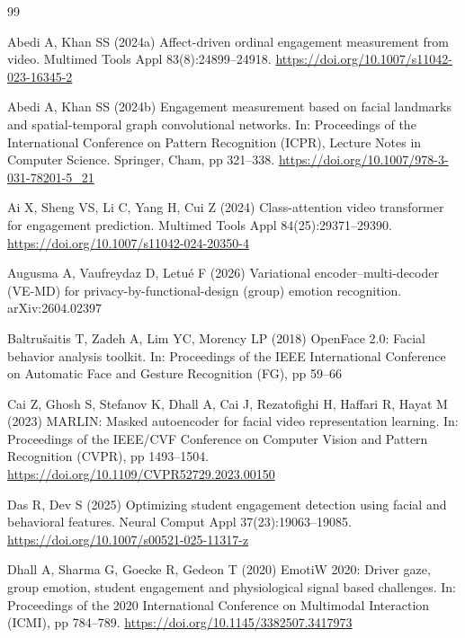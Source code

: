 \documentclass[pdflatex,iicol,sn-basic]{sn-jnl}
\begin{document}
\begin{thebibliography}{99}

Abedi A, Khan SS (2024a) Affect-driven ordinal engagement measurement from video. Multimed Tools Appl 83(8):24899--24918. \url{https://doi.org/10.1007/s11042-023-16345-2}

Abedi A, Khan SS (2024b) Engagement measurement based on facial landmarks and spatial-temporal graph convolutional networks. In: Proceedings of the International Conference on Pattern Recognition (ICPR), Lecture Notes in Computer Science. Springer, Cham, pp 321--338. \url{https://doi.org/10.1007/978-3-031-78201-5\_21}

Ai X, Sheng VS, Li C, Yang H, Cui Z (2024) Class-attention video transformer for engagement prediction. Multimed Tools Appl 84(25):29371--29390. \url{https://doi.org/10.1007/s11042-024-20350-4}

Augusma A, Vaufreydaz D, Letu\'{e} F (2026) Variational encoder--multi-decoder (VE-MD) for privacy-by-functional-design (group) emotion recognition. arXiv:2604.02397

Baltru\v{s}aitis T, Zadeh A, Lim YC, Morency LP (2018) OpenFace 2.0: Facial behavior analysis toolkit. In: Proceedings of the IEEE International Conference on Automatic Face and Gesture Recognition (FG), pp 59--66

Cai Z, Ghosh S, Stefanov K, Dhall A, Cai J, Rezatofighi H, Haffari R, Hayat M (2023) MARLIN: Masked autoencoder for facial video representation learning. In: Proceedings of the IEEE/CVF Conference on Computer Vision and Pattern Recognition (CVPR), pp 1493--1504. \url{https://doi.org/10.1109/CVPR52729.2023.00150}

Das R, Dev S (2025) Optimizing student engagement detection using facial and behavioral features. Neural Comput Appl 37(23):19063--19085. \url{https://doi.org/10.1007/s00521-025-11317-z}

Dhall A, Sharma G, Goecke R, Gedeon T (2020) EmotiW 2020: Driver gaze, group emotion, student engagement and physiological signal based challenges. In: Proceedings of the 2020 International Conference on Multimodal Interaction (ICMI), pp 784--789. \url{https://doi.org/10.1145/3382507.3417973}


\end{thebibliography}
\end{document}
